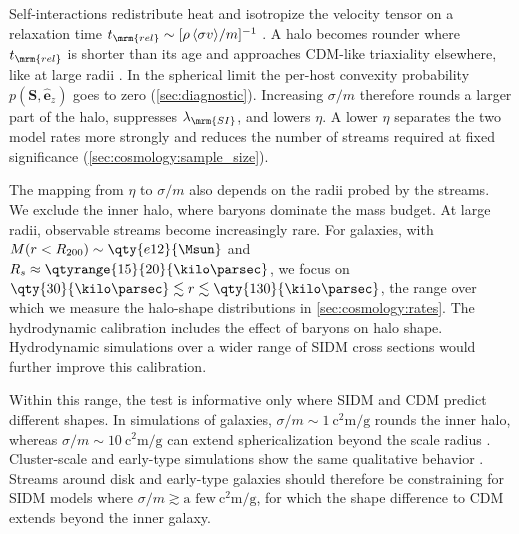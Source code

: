 \documentclass[linenumbers,twocolumn]{aastex701}
\renewcommand{\mbf}[1]{\boldsymbol{#1}}
\newcommand{\zhat}{\hat{\mbf{e}}_z} %
\newcommand{\lamSI}{\ensuremath{\lambda_{\mrm{SI}}}}  %
\begin{document}
        Self-interactions redistribute heat and isotropize the velocity tensor on a relaxation time $t_{\mrm{rel}}\sim[\rho\,\langle\sigma v\rangle/m]^{-1}$ \citep{Spergel+Steinhardt:2000:ObservationalEvidenceSelfInteracting}. %
        A halo becomes rounder where $t_{\mrm{rel}}$ is shorter than its age and approaches \gls{CDM}-like triaxiality elsewhere, like at large radii \citep{Dave+:2001:HaloPropertiesCosmological,Peter+:2013:CosmologicalSimulationsSelfInteracting}. %
        In the spherical limit the per-host convexity probability $p(\mbf{S},\zhat)$ goes to zero (\autoref{sec:diagnostic}). %
        Increasing $\sigma/m$ therefore rounds a larger part of the halo, suppresses $\lamSI$, and lowers $\eta$. %
        A lower $\eta$ separates the two model rates more strongly and reduces the number of streams required at fixed significance (\autoref{sec:cosmology:sample_size}). %

        The mapping from $\eta$ to $\sigma/m$ also depends on the radii probed by the streams. %
        We exclude the inner halo, where baryons dominate the mass budget. %
        At large radii, observable streams become increasingly rare. %
        For galaxies, with $M(r<R_{200})\sim\qty{e12}{\Msun}$ and $R_s\approx\qtyrange{15}{20}{\kilo\parsec}$, we focus on $\qty{30}{\kilo\parsec}\lesssim r\lesssim\qty{130}{\kilo\parsec}$, the range over which we measure the halo-shape distributions in \autoref{sec:cosmology:rates}. %
        The hydrodynamic calibration includes the effect of baryons on halo shape. %
        Hydrodynamic simulations over a wider range of \gls{SIDM} cross sections would further improve this calibration. %

        Within this range, the test is informative only where \gls{SIDM} and \gls{CDM} predict different shapes. %
        In simulations of galaxies, $\sigma/m\sim \qty{1}{\square\centi\meter\per\gram}$ rounds the inner halo, whereas $\sigma/m\sim\qty{10}{\square\centi\meter\per\gram}$ can extend sphericalization beyond the scale radius \citep{Peter+:2013:CosmologicalSimulationsSelfInteracting,Chua+:2021:ImpactInelasticSelfinteracting,Fischer+:2024:CosmologicalIdealizedSimulations,Bautista+:2025:JeansModelShapes}. %
        Cluster-scale and early-type simulations show the same qualitative behavior \citep{Brinckmann+:2018:StructureAssemblyHistory,Robertson+:2019:ObservableTestsSelfinteracting,Despali+:2022:ConstrainingSIDMHalo}. %
        Streams around disk and early-type galaxies should therefore be constraining for \gls{SIDM} models where $\sigma/m\gtrsim\text{a few}\ \unit{\square\centi\meter\per\gram}$, for which the shape difference to \gls{CDM} extends beyond the inner galaxy. %
\end{document}
